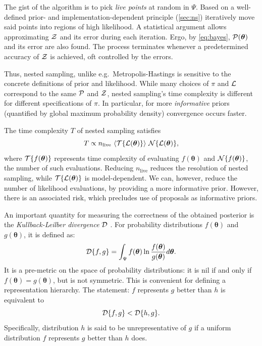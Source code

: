\documentclass[usenatbib]{mnras}
\begin{document}
The gist of the algorithm \citep{Skilling2006} is to pick \emph{live
  points} at random in $\Psi$. Based on a well-defined prior- and
implementation-dependent principle (\cref{sec:ns}) iteratively move
said points into regions of high likelihood. A statistical argument
allows approximating ${\cal Z}$ and its error during each
iteration. Ergo, by \cref{eq:bayes}, ${\cal P}(\bm{\theta})$ and its
error are also found. The process terminates whenever a predetermined
accuracy of ${\cal Z}$ is achieved, oft controlled by the errors.

Thus, nested sampling, unlike e.g.~Metropolis-Hastings
\cite{Metropolis-Hastings-Gibbs} is sensitive to the concrete
definitions of prior and likelihood. While many choices of $\pi$ and
${\cal L}$ correspond to the same ${\cal P}$ and ${\cal Z}$, nested
sampling's time complexity is different for different specifications
of $\pi$\citep{Skilling}. In particular, for more \emph{informative}
priors (quantified by global maximum probability density) convergence
occurs faster.

The time complexity $T$ of nested sampling satisfies
\begin{equation}\label{eq:complexity}
  T \propto  n_\text{live}\  \langle {\cal T}\{{\cal L}(\bm{\theta})\} \rangle \ {\cal N}\{{\cal L}(\bm{\theta}) \},
\end{equation}
where ${\cal T}\{f(\bm{\theta})\}$ represents time complexity of
evaluating $f(\bm{\theta})$ and ${\cal N}\{f(\bm{\theta})\}$, the
number of such evaluations. Reducing $n_\text{live}$ reduces the
resolution of nested sampling, while
$ {\cal T}\{{\cal L}(\bm{\theta})\}$ is model-dependent. We can,
however, reduce the number of likelihood evaluations, by providing a
more informative prior. However, there is an associated risk, which
precludes use of proposals as informative priors.

An important quantity for measuring the correctness of the obtained
posterior is the \emph{Kullback-Leilber divergence} ${\cal D}$
\citep{Kullback_1951}. For probability distributions
\(f(\bm{\theta})\) and \(g(\bm{\theta})\), it is defined as:
\begin{equation}
  \label{eq:kl-def}
  {\cal D}\{f, g \} = \int_{\Psi}f(\bm{\theta}) \ln \frac{f(\bm{\theta})}{g(\bm{\theta})} d \bm{\theta}.
\end{equation}
It is a pre-metric on the space of probability distributions: it is
nil if and only if $f(\bm{\theta}) = g(\bm{\theta})$, but is not
symmetric. This is convenient for defining a representation
hierarchy. The statement: $f$ represents $g$ better than $h$ is
equivalent to
\begin{equation}
  \label{eq:hierarchy}
  {\cal D}\{f, g\} < {\cal D}\{h, g\}.
\end{equation}
Specifically, distribution $h$ is said to be unrepresentative of $g$
if a uniform distribution $f$ represents $g$ better than $h$ does.
\end{document}
